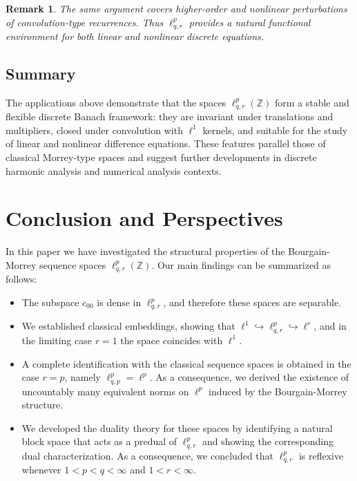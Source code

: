 \documentclass[preprint,12pt]{elsarticle}
\newtheorem{remark}[theorem]{Remark}
\begin{document}
\begin{remark}
The same argument covers higher-order and nonlinear perturbations of 
convolution-type recurrences.  
Thus $\ell^{p}_{q,r}$ provides a natural functional environment 
for both linear and nonlinear discrete equations.
\end{remark}

\subsection{Summary}

The applications above demonstrate that the spaces $\ell^{p}_{q,r}(\mathbb Z)$ 
form a stable and flexible discrete Banach framework:
they are invariant under translations and multipliers,  
closed under convolution with $\ell^1$ kernels,  
and suitable for the study of linear and nonlinear difference equations.  
These features parallel those of classical Morrey-type spaces and suggest
further developments in discrete harmonic analysis and numerical analysis contexts.

\section*{Conclusion and Perspectives}

In this paper we have investigated the structural properties of the Bourgain-Morrey sequence spaces 
$\ell^{p}_{q,r}(\mathbb{Z})$. Our main findings can be summarized as follows:

\begin{itemize}
    \item The subspace $c_{00}$ is dense in $\ell^{p}_{q,r}$, and therefore these spaces are separable.
    \item We established classical embeddings, showing that $\ell^1 \hookrightarrow \ell^{p}_{q,r} \hookrightarrow \ell^r$, and in the limiting case $r=1$ the space coincides with $\ell^1$.
    \item A complete identification with the classical sequence spaces is obtained in the case $r=p$, namely $\ell^{p}_{q,p} = \ell^p$. 
          As a consequence, we derived the existence of uncountably many equivalent norms on $\ell^p$ induced by the Bourgain-Morrey structure.
     \item We developed the duality theory for these spaces by identifying a natural block space that acts as a predual of $\ell^{p}_{q,r}$ and showing the corresponding dual characterization. As a consequence, we concluded that $\ell^{p}_{q,r}$ is reflexive whenever $1<p<q<\infty$ and $1<r<\infty$.

\end{itemize}
\end{document}
